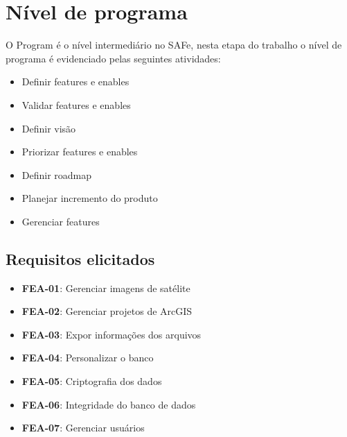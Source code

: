 \section{Nível de programa}

  O Program é o nível intermediário no SAFe, nesta etapa do trabalho o nível de programa é evidenciado pelas seguintes atividades:

  \begin{itemize}
    \item Definir features e enables
    \item Validar features e enables
    \item Definir visão
    \item Priorizar features e enables
    \item Definir roadmap
    \item Planejar incremento do produto
    \item Gerenciar features
  \end{itemize}

\subsection{Requisitos elicitados}

  \begin{itemize}
    \item \textbf{FEA-01}: Gerenciar imagens de satélite
    \item \textbf{FEA-02}: Gerenciar projetos de ArcGIS
    \item \textbf{FEA-03}: Expor informações dos arquivos
    \item \textbf{FEA-04}: Personalizar o banco
    \item \textbf{FEA-05}: Criptografia dos dados
    \item \textbf{FEA-06}: Integridade do banco de dados
    \item \textbf{FEA-07}: Gerenciar usuários
  \end{itemize}


